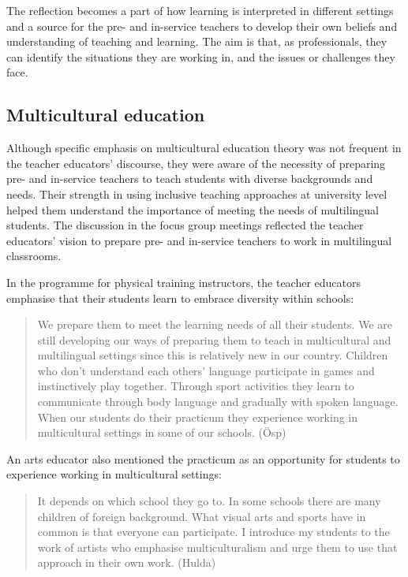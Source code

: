 \documentclass[output=paper]{langscibook}
\begin{document}
The reflection becomes a part of how learning is interpreted in different settings and a source for the pre- and in-service teachers to develop their own beliefs and understanding of teaching and learning. The aim is that, as professionals, they can identify the situations they are working in, and the issues or challenges they face. 

\subsection{Multicultural education} %

Although specific emphasis on multicultural education theory was not frequent in the teacher educators’ discourse, they were aware of the necessity of preparing pre- and in-service teachers to teach students with diverse backgrounds and needs. Their strength in using inclusive teaching approaches at university level helped them understand the importance of meeting the needs of multilingual students{.} The discussion in the focus group meetings reflected the teacher educators’ vision to prepare pre- and in-service teachers to work in multilingual classrooms. 

In the programme for physical training instructors, the teacher educators emphasise that their students learn to embrace diversity within schools: 

\begin{quote}
We prepare them to meet the learning needs of all their students. We are still developing our ways of preparing them to teach in multicultural and multilingual settings since this is relatively new in our country. Children who don’t understand each others’ language participate in games and instinctively play together. Through sport activities they learn to communicate through body language and gradually with spoken language. When our students do their practicum they experience working in multicultural settings in some of our schools. (Ösp)
\end{quote}

An arts educator also mentioned the practicum as an opportunity for students to experience working in multicultural settings:

\begin{quote}
It depends on which school they go to. In some schools there are many children of foreign background. What visual arts and sports have in common is that everyone can participate. I introduce my students to the work of artists who emphasise multiculturalism and urge them to use that approach in their own work. (Hulda)
\end{quote}
\end{document}
